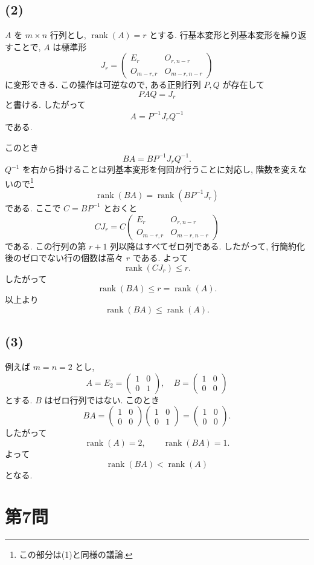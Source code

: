 \documentclass[uplatex,dvipdfmx,a4paper,14pt]{jsarticle}
\newcommand{\rank}{\operatorname{rank}}
\begin{document}
\subsection*{(2)}
$A$ を $m\times n$ 行列とし, $\rank(A)=r$ とする. 行基本変形と列基本変形を繰り返すことで, $A$ は標準形
\[
J_r=
\begin{pmatrix}
E_r&O_{r,n-r}\\
O_{m-r,r}&O_{m-r,n-r}
\end{pmatrix}
\]
に変形できる. この操作は可逆なので, ある正則行列 $P,Q$ が存在して
\[
PAQ=J_r
\]
と書ける. したがって
\[
A=P^{-1}J_rQ^{-1}
\]
である.

このとき
\[
BA=BP^{-1}J_rQ^{-1}.
\]
$Q^{-1}$ を右から掛けることは列基本変形を何回か行うことに対応し, 階数を変えないので\footnote{この部分は(1)と同様の議論. }
\[
\rank(BA)=\rank(BP^{-1}J_r)
\]
である. ここで $C=BP^{-1}$ とおくと
\[
CJ_r=
C
\begin{pmatrix}
E_r&O_{r,n-r}\\
O_{m-r,r}&O_{m-r,n-r}
\end{pmatrix}
\]
である. この行列の第 $r+1$ 列以降はすべてゼロ列である. したがって, 行簡約化後のゼロでない行の個数は高々 $r$ である. よって
\[
\rank(CJ_r)\le r.
\]
したがって
\[
\rank(BA)\le r=\rank(A).
\]
以上より
\[
\boxed{\rank(BA)\le \rank(A).}
\]

\subsection*{(3)}
例えば $m=n=2$ とし,
\[
A=E_2=\begin{pmatrix}1&0\\0&1\end{pmatrix},\quad
B=\begin{pmatrix}1&0\\0&0\end{pmatrix}
\]
とする. $B$ はゼロ行列ではない. このとき
\[
BA=
\begin{pmatrix}1&0\\0&0\end{pmatrix}
\begin{pmatrix}1&0\\0&1\end{pmatrix}
=
\begin{pmatrix}1&0\\0&0\end{pmatrix}.
\]
したがって
\[
\rank(A)=2,\qquad \rank(BA)=1.
\]
よって
\[
\boxed{\rank(BA)<\rank(A)}
\]
となる.

\section*{第7問}
\end{document}
